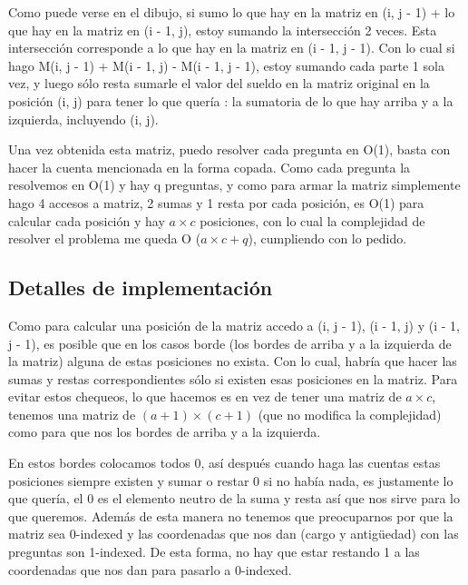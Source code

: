 Como puede verse en el dibujo, si sumo lo que hay en la matriz en (i, j - 1) + lo que hay en la matriz en (i - 1, j), estoy sumando la intersección 2 veces. Esta intersección corresponde a lo que hay en la matriz en (i - 1, j - 1). Con lo cual si hago M(i, j - 1) + M(i - 1, j) - M(i - 1, j - 1), estoy sumando cada parte 1 sola vez, y luego sólo resta sumarle el valor del sueldo en la matriz original en la posición (i, j) para tener lo que quería : la sumatoria de lo que hay arriba y a la izquierda, incluyendo (i, j). \newline

Una vez obtenida esta matriz, puedo resolver cada pregunta en O(1), basta con hacer la cuenta mencionada en la forma copada. Como cada pregunta la resolvemos en O(1) y hay q preguntas, y como para armar la matriz simplemente hago 4 accesos a matriz, 2 sumas y 1 resta por cada posición, es O(1) para calcular cada posición y hay $a \times c$ posiciones, con lo cual la complejidad de resolver el problema me queda O ($a \times c + q$), cumpliendo con lo pedido.

\subsection {Detalles de implementación}

Como para calcular una posición de la matriz accedo a (i, j - 1),  (i - 1, j) y (i - 1, j - 1), es posible que en los casos borde (los bordes de arriba y a la izquierda de la matriz) alguna de estas posiciones no exista. Con lo cual, habría que hacer las sumas y restas correspondientes sólo si existen esas posiciones en la matriz. Para evitar estos chequeos, lo que hacemos es en vez de tener una matriz de $a \times c$, tenemos una matriz de $(a + 1) \times (c + 1)$ (que no modifica la complejidad) como para que nos  los bordes de arriba y a la izquierda. \newline

En estos bordes colocamos todos 0, así después cuando haga las cuentas estas posiciones siempre existen y sumar o restar 0 si no había nada, es justamente lo que quería, el 0 es el elemento neutro de la suma y resta así que nos sirve para lo que queremos. Además de esta manera no tenemos que preocuparnos por que la matriz sea 0-indexed y las coordenadas que nos dan (cargo y antigüedad) con las preguntas son 1-indexed. De esta forma, no hay que estar restando 1 a las coordenadas que nos dan para pasarlo a 0-indexed.\newline

